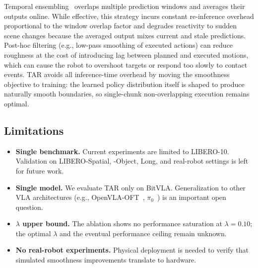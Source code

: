 

Temporal ensembling~\cite{zhao2023act} overlaps multiple prediction windows and averages their outputs online. While effective, this strategy incurs constant re-inference overhead proportional to the window overlap factor and degrades reactivity to sudden scene changes because the averaged output mixes current and stale predictions. Post-hoc filtering (e.g., low-pass smoothing of executed actions) can reduce roughness at the cost of introducing lag between planned and executed motions, which can cause the robot to overshoot targets or respond too slowly to contact events. TAR avoids all inference-time overhead by moving the smoothness objective to training: the learned policy distribution itself is shaped to produce naturally smooth boundaries, so single-chunk non-overlapping execution remains optimal.

\subsection{Limitations}
\begin{itemize}
    \item \textbf{Single benchmark.} Current experiments are limited to LIBERO-10. Validation on LIBERO-Spatial, -Object, Long, and real-robot settings is left for future work.
    \item \textbf{Single model.} We evaluate TAR only on BitVLA. Generalization to other VLA architectures (e.g., OpenVLA-OFT~\cite{kim2025openvlaoft}, $\pi_0$~\cite{black2024pi0}) is an important open question.
    \item \textbf{$\lambda$ upper bound.} The ablation shows no performance saturation at $\lambda=0.10$; the optimal $\lambda$ and the eventual performance ceiling remain unknown.
    \item \textbf{No real-robot experiments.} Physical deployment is needed to verify that simulated smoothness improvements translate to hardware.
\end{itemize}
